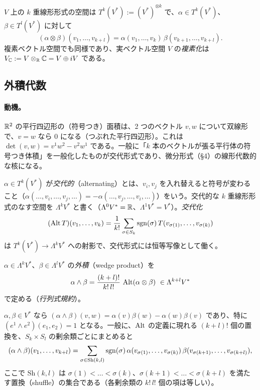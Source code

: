 $V$ 上の $k$ 重線形形式の空間は $T^k(V^*):=(V^*)^{\otimes k}$ で、$\alpha\in T^k(V^*)$、$\beta\in T^l(V^*)$ に対して
\[
(\alpha\otimes\beta)(v_1,\dots,v_{k+l})=\alpha(v_1,\dots,v_k)\,\beta(v_{k+1},\dots,v_{k+l}).
\]
複素ベクトル空間でも同様であり、実ベクトル空間 $V$ の\emph{複素化}は $V_{\mathbb C}:=V\otimes_{\mathbb R}\mathbb C=V\oplus iV$ である。

\subsection{外積代数}
\paragraph{動機。}$\mathbb R^2$ の平行四辺形の（符号つき）面積は、2 つのベクトル $v,w$ について双線形で、$v=w$ なら $0$ になる（つぶれた平行四辺形）。これは $\det(v,w)=v^1w^2-v^2w^1$ である。一般に「$k$ 本のベクトルが張る平行体の符号つき体積」を一般化したものが交代形式であり、微分形式（§4）の線形代数的な核になる。

\begin{defn}
$\alpha\in T^k(V^*)$ が\emph{交代的}（alternating）とは、$v_i,v_j$ を入れ替えると符号が変わること（$\alpha(\dots,v_i,\dots,v_j,\dots)=-\alpha(\dots,v_j,\dots,v_i,\dots)$）をいう。交代的な $k$ 重線形形式のなす空間を $\Lambda^kV^*$ と書く（$\Lambda^0V^*=\mathbb R$、$\Lambda^1V^*=V^*$）。\emph{交代化}
\[
(\operatorname{Alt} T)(v_1,\dots,v_k)=\frac1{k!}\sum_{\sigma\in S_k}\operatorname{sgn}(\sigma)\,T(v_{\sigma(1)},\dots,v_{\sigma(k)})
\]
は $T^k(V^*)\to\Lambda^kV^*$ への射影で、交代形式には恒等写像として働く。
\end{defn}

\begin{defn}[外積]
$\alpha\in\Lambda^kV^*$、$\beta\in\Lambda^lV^*$ の\emph{外積}（wedge product）を
\[
\alpha\wedge\beta=\frac{(k+l)!}{k!\,l!}\,\Alt(\alpha\otimes\beta)\ \in\Lambda^{k+l}V^*
\]
で定める（\emph{行列式規約}）。
\end{defn}

$\alpha,\beta\in V^*$ なら $(\alpha\wedge\beta)(v,w)=\alpha(v)\beta(w)-\alpha(w)\beta(v)$ であり、特に $(e^1\wedge e^2)(e_1,e_2)=1$ となる。一般に、$\operatorname{Alt}$ の定義に現れる $(k+l)!$ 個の置換を、$S_k\times S_l$ の剰余類ごとにまとめると
\begin{equation}\label{A:eq:shuffle}
(\alpha\wedge\beta)(v_1,\dots,v_{k+l})=\sum_{\sigma\in\mathrm{Sh}(k,l)}\operatorname{sgn}(\sigma)\,\alpha(v_{\sigma(1)},\dots,v_{\sigma(k)})\,\beta(v_{\sigma(k+1)},\dots,v_{\sigma(k+l)}),
\end{equation}
ここで $\mathrm{Sh}(k,l)$ は $\sigma(1)<\dots<\sigma(k)$、$\sigma(k+1)<\dots<\sigma(k+l)$ を満たす置換（shuffle）の集合である（各剰余類の $k!\,l!$ 個の項は等しい）。

